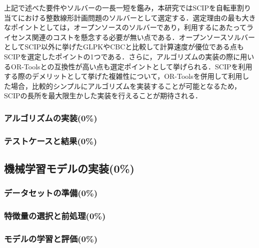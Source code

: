           \par 上記で述べた要件やソルバーの一長一短を鑑み，本研究ではSCIPを自転車割り当てにおける整数線形計画問題のソルバーとして選定する．選定理由の最も大きなポイントとしては，オープンソースのソルバーであり，利用するにあたってライセンス関連のコストを懸念する必要が無い点である．オープンソースソルバーとしてSCIP以外に挙げたGLPKやCBCと比較して計算速度が優位である点もSCIPを選定したポイントの1つである．さらに，アルゴリズムの実装の際に用いるOR-Toolsとの互換性が高い点も選定ポイントとして挙げられる．SCIPを利用する際のデメリットとして挙げた複雑性について，OR-Toolsを併用して利用した場合，比較的シンプルにアルゴリズムを実装することが可能となるため，SCIPの長所を最大限生かした実装を行えることが期待される．
          
      \subsubsection{アルゴリズムの実装(0\%)}
        \label{sec:アルゴリズムの実装}
          \par
          
      \subsubsection{テストケースと結果(0\%)}
        \label{sec:テストケースと結果}
          \par  
  
  \subsection{機械学習モデルの実装(0\%)}
    \label{sec:機械学習モデルの実装}
      \par 
      
      \subsubsection{データセットの準備(0\%)}
        \label{sec:データセットの準備}
          \par
          
      \subsubsection{特徴量の選択と前処理(0\%)}
        \label{sec:特徴量の選択と前処理}
          \par
          
      \subsubsection{モデルの学習と評価(0\%)}
        \label{sec:モデルの学習と評価}
          \par
          
